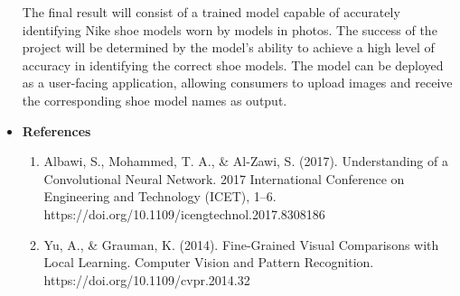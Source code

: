 \documentclass{article}
\begin{document}
\begin{itemize}
		The final result will consist of a trained model capable of accurately identifying Nike shoe models worn by models in photos. The success of the project will be determined by the model's ability to achieve a high level of accuracy in identifying the correct shoe models. The model can be deployed as a user-facing application, allowing consumers to upload images and receive the corresponding shoe model names as output. 
‌             \item[] \textbf{References} 
		\begin{enumerate}
		\item Albawi, S., Mohammed, T. A., \& Al-Zawi, S. (2017). Understanding of a Convolutional Neural Network. 2017 International Conference on Engineering and Technology (ICET), 1–6. https://doi.org/10.1109/icengtechnol.2017.8308186  
		\item Yu, A., \& Grauman, K. (2014). Fine-Grained Visual Comparisons with Local Learning. Computer Vision and Pattern Recognition. https://doi.org/10.1109/cvpr.2014.32 
		\end{enumerate}
        \end{itemize}
\end{document}

